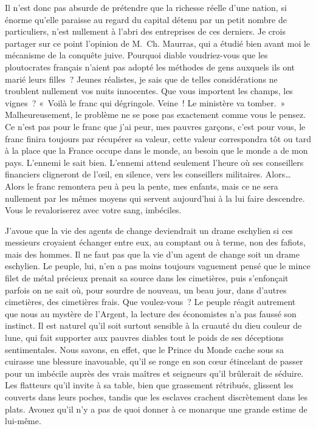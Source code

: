\documentclass[french,twoside]{book} %
\begin{document}
\bigbreak
\noindent Il n’est donc pas absurde de prétendre que la richesse réelle d’une nation, si énorme qu’elle paraisse au regard du capital détenu par un petit nombre de particuliers, n’est nullement à l’abri des entreprises de ces derniers. Je crois partager sur ce point l’opinion de M. Ch. Maurras, qui a étudié bien avant moi le mécanisme de la conquête juive. Pourquoi diable voudriez-vous que les ploutocrates français n’aient pas adopté les méthodes de gens auxquels ils ont marié leurs filles ? Jeunes réalistes, je sais que de telles considérations ne troublent nullement vos nuits innocentes. Que vous importent les champs, les vignes ? « Voilà le franc qui dégringole. Veine ! Le ministère va tomber. » Malheureusement, le problème ne se pose pas exactement comme vous le pensez. Ce n’est pas pour le franc que j’ai peur, mes pauvres garçons, c’est pour vous, le franc finira toujours par récupérer sa valeur, cette valeur correspondra tôt ou tard à la place que la France occupe dans le monde, au besoin que le monde a de mon pays. L’ennemi le sait bien. L’ennemi attend seulement l’heure où ses conseillers financiers cligneront de l’œil, en silence, vers les conseillers militaires. Alors… Alors le franc remontera peu à peu la pente, mes enfants, mais ce ne sera nullement par les mêmes moyens qui servent aujourd’hui à la lui faire descendre. Vous le revaloriserez avec votre sang, imbéciles.\par
\bigbreak
\noindent J’avoue que la vie des agents de change deviendrait un drame eschylien si ces messieurs croyaient échanger entre eux, au comptant ou à terme, non des fafiots, mais des hommes. Il ne faut pas que la vie d’un agent de change soit un drame eschylien. Le peuple, lui, n’en a pas moins toujours vaguement pensé que le mince filet de métal précieux prenait sa source dans les cimetières, puis s’enfonçait parfois on ne sait où, pour sourdre de nouveau, un beau jour, dans d’autres cimetières, des cimetières frais. Que voulez-vous ? Le peuple réagit autrement que nous au mystère de l’Argent, la lecture des économistes n’a pas faussé son instinct. Il est naturel qu’il soit surtout sensible à la cruauté du dieu couleur de lune, qui fait supporter aux pauvres diables tout le poids de ses déceptions sentimentales. Nous savons, en effet, que le Prince du Monde cache sous sa cuirasse une blessure inavouable, qu’il se ronge en son cœur étincelant de passer pour un imbécile auprès des vrais maîtres et seigneurs qu’il brûlerait de séduire. Les flatteurs qu’il invite à sa table, bien que grassement rétribués, glissent les couverts dans leurs poches, tandis que les esclaves crachent discrètement dans les plats. Avouez qu’il n’y a pas de quoi donner à ce monarque une grande estime de lui-même.\par
\end{document}
